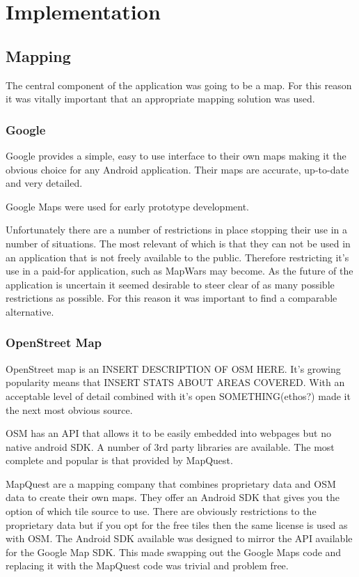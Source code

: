 \chapter{Implementation}

\section{Mapping}
The central component of the application was going to be a map. For this reason it was vitally important that an appropriate mapping solution was used.

\subsection{Google}
Google provides a simple, easy to use interface to their own maps making it the obvious choice for any Android application. Their maps are accurate, up-to-date and very detailed.

Google Maps were used for early prototype development.

Unfortunately there are a number of restrictions in place stopping their use in a number of situations. The most relevant of which is that they can not be used in an application that is not freely available to the public. Therefore restricting it's use in a paid-for application, such as MapWars may become. As the future of the application is uncertain it seemed desirable to steer clear of as many possible restrictions as possible. For this reason it was important to find a comparable alternative.

\subsection{OpenStreet Map}
OpenStreet map is an INSERT DESCRIPTION OF OSM HERE. It's growing popularity means that INSERT STATS ABOUT AREAS COVERED. With an acceptable level of detail combined with it's open SOMETHING(ethos?) made it the next most obvious source.

OSM has an API that allows it to be easily embedded into webpages but no native android SDK. A number of 3rd party libraries are available. The most complete and popular is that provided by MapQuest.

MapQuest are a mapping company that combines proprietary data and OSM data to create their own maps. They offer an Android SDK that gives you the option of which tile source to use. There are obviously restrictions to the proprietary data but if you opt for the free tiles then the same license is used as with OSM. The Android SDK available was designed to mirror the API available for the Google Map SDK. This made swapping out the Google Maps code and replacing it with the MapQuest code was trivial and problem free.

